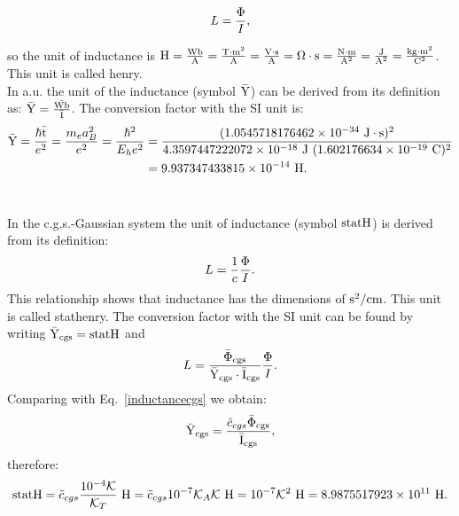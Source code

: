 \documentclass[12pt,a4paper,twoside]{report}
\def\hbarf{1.0545718176462\times 10^{-34}}
\def\e{1.602176634\times 10^{-19}}
\def\baru{4.3597447222072\times 10^{-18}}
\def\bary{9.937347433815\times 10^{-14}}
\def\ytoy{8.9875517923\times 10^{11}}
\begin{document}
{\begin{tcolorbox}
\begin{equation}
L={\Phi \over I},
\end{equation}
\end{tcolorbox}

so the unit of inductance is ${\rm H}={{\rm Wb} \over {\rm A}}={{\rm T} \cdot {\rm m}^2 \over {\rm A}}=
{{\rm V}\cdot {\rm s} \over {\rm A}} = \Omega \cdot {\rm s}= {{\rm N} \cdot {\rm m} \over {\rm A}^2}={{\rm J}\over {\rm A}^2}=
{{\rm kg}\cdot {\rm m}^2 \over {\rm C}^2}$. This unit is called henry. 
\\

{\color{web-blue} In a.u. the unit of the inductance (symbol ${\rm \bar Y}$) 
can be derived from its definition as:
${\rm \bar Y}={{\rm \bar {Wb}} \over {\rm \bar I}}$. The conversion factor with the SI unit is:
\begin{align}
{\rm \bar Y} = {\hbar {\rm \bar t}\over e^2}={m_e a_B^2 \over e^2}={\hbar^2\over E_h e^2}
&= {(\hbarf\ {\rm J}\cdot {\rm s})^2 \over \baru\ {\rm J}\ (\e\ {\rm C})^2}\nonumber \\
&= \bary\ {\rm H}.
\end{align}
\\
}

{\color{orange} In the c.g.s.-Gaussian system the unit of inductance
(symbol ${\rm statH}$) is derived from its definition: 
\begin{equation}
L={1\over c} {\Phi \over I}.
\label{inductancecgs}
\end{equation}
This relationship shows that inductance has the dimensions of 
${\rm s}^2/{\rm cm}$. This unit is called stathenry.
The conversion factor with the SI unit can be found by writing
${\rm \bar Y_{cgs}}={\rm statH}$ and 
\begin{equation}
L = {{\rm \bar \Phi_{cgs}} \over {\rm \bar Y_{cgs}}\cdot {\rm \bar I_{cgs}}} {\Phi \over I}.
\end{equation}
Comparing with Eq.~\ref{inductancecgs} we obtain:
\begin{equation}
{\rm \bar Y_{cgs}}= {\tilde c_{cgs} {\rm \bar \Phi_{cgs}} \over {\rm \bar I_{cgs}}},
\end{equation}
therefore:
\begin{equation}
{\rm statH}=\tilde c_{cgs} {10^{-4} \mathcal{K} \over \mathcal{K}_T}\ {\rm H} =
{\tilde c_{cgs}} {10^{-7} \mathcal{K}_A \mathcal{K}}\ {\rm H}=
10^{-7} \mathcal{K}^2\ {\rm H} = \ytoy\ {\rm H}.
\end{equation}
\\
}

}
\end{document}
